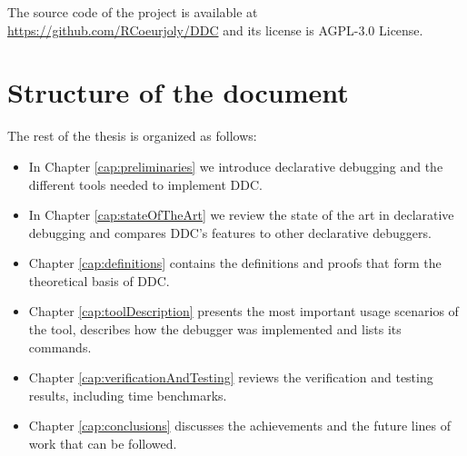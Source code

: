 The source code of the project is available at \url{https://github.com/RCoeurjoly/DDC} 
and its license is AGPL-3.0 License.

\section{Structure of the document}
The rest of the thesis is organized as follows:
\begin{itemize}
    \item In Chapter \ref{cap:preliminaries} we introduce declarative debugging and the different tools needed to implement DDC.
    \item  In Chapter \ref{cap:stateOfTheArt} we review the state of the art in declarative debugging and compares DDC's features to other declarative debuggers.
    \item Chapter \ref{cap:definitions} contains the definitions and proofs that form the theoretical basis of DDC. 
    \item Chapter \ref{cap:toolDescription} presents the most important usage scenarios of the tool, describes how the debugger was implemented and lists its commands.
    \item Chapter \ref{cap:verificationAndTesting} reviews the verification and testing results, including time benchmarks.
    \item Chapter \ref{cap:conclusions} discusses the achievements and the future lines of work that can be followed.
\end{itemize}
